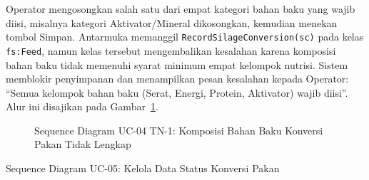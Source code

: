 Operator mengosongkan salah satu dari empat kategori bahan baku yang
wajib diisi, misalnya kategori Aktivator/Mineral dikosongkan, kemudian
menekan tombol Simpan. Antarmuka memanggil \texttt{RecordSilageConversion(sc)}
pada kelas \texttt{fs:Feed}, namun kelas tersebut mengembalikan kesalahan
karena komposisi bahan baku tidak memenuhi syarat minimum empat kelompok
nutrisi. Sistem memblokir penyimpanan dan menampilkan pesan kesalahan
kepada Operator: ``Semua kelompok bahan baku (Serat, Energi, Protein,
Aktivator) wajib diisi''. Alur ini disajikan pada
Gambar~\ref{fig:seq_uc04_tn1_validasi}.

\begin{figure}[htbp]
\centering
{}
\caption{Sequence Diagram UC-04 TN-1: Komposisi Bahan Baku Konversi Pakan Tidak Lengkap}
\label{fig:seq_uc04_tn1_validasi}
\end{figure}

\newpage


\item{Sequence Diagram UC-05: Kelola Data Status Konversi Pakan}

